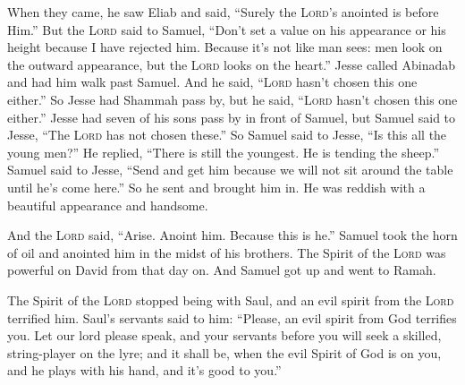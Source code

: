 \begin{inparaenum}
     When they came, he saw Eliab and said, ``Surely the \textsc{Lord}'s anointed is before Him.''%
     But the \textsc{Lord} said to Samuel, ``Don't set a value on his appearance or his height because I have rejected him. Because it's not like man sees: men look on the outward appearance, but the \textsc{Lord} looks on the heart.''%
     Jesse called Abinadab and had him walk past Samuel. And he said, ``\textsc{Lord} hasn't chosen this one either.''%
     So Jesse had Shammah pass by, but he said, ``\textsc{Lord} hasn't chosen this one either.''%
     Jesse had seven of his sons pass by in front of Samuel, but Samuel said to Jesse, ``The \textsc{Lord} has not chosen these.''%
     So Samuel said to Jesse, ``Is this all the young men?'' He replied, ``There is still the youngest. He is tending the sheep.'' Samuel said to Jesse, ``Send and get him because we will not sit around the table until he's come here.''%
     So he sent and brought him in. He was reddish with a beautiful appearance and handsome.%
    
    And the \textsc{Lord} said, ``Arise. Anoint him. Because this is he.''%
     Samuel took the horn of oil and anointed him in the midst of his brothers. The Spirit of the \textsc{Lord} was powerful on David from that day on. And Samuel got up and went to Ramah.%
    
     The Spirit of the \textsc{Lord} stopped being with Saul, and an evil spirit from the \textsc{Lord} terrified him.%
     Saul's servants said to him: ``Please, an evil spirit from God terrifies you.%
     Let our lord please speak, and your servants before you will seek a skilled, string-player on the lyre; and it shall be, when the evil Spirit of God is on you, and he plays with his hand, and it's good to you.''%
    

\end{inparaenum}
